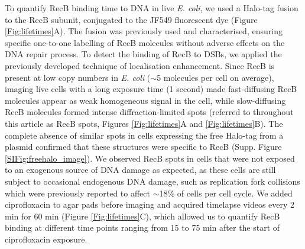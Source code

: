 To quantify RecB binding time to DNA in live \textit{E. coli}, we used a Halo-tag fusion to the RecB subunit, conjugated to the JF549 fluorescent dye (Figure \ref{Fig:lifetimes}A). The fusion was previously used and characterised, ensuring specific one-to-one labelling of RecB molecules without adverse effects on the DNA repair process.\cite{Lepore2019a} To detect the binding of RecB to DSBs, we applied the previously developed technique of localisation enhancement.\cite{Yu2006, Elf2007} Since RecB is present at low copy numbers in \textit{E. coli} ($\sim$5 molecules per cell on average\cite{Lepore2019a}), imaging live cells with a long exposure time (1 second) made fast-diffusing RecB molecules appear as weak homogeneous signal in the cell, while slow-diffusing RecB molecules formed intense diffraction-limited spots (referred to throughout this article as RecB spots, Figures \ref{Fig:lifetimes}A and \ref{Fig:lifetimes}B). The complete absence of similar spots in cells expressing the free Halo-tag from a plasmid confirmed that these structures were specific to RecB (Supp. Figure \ref{SIFig:freehalo_image}). We observed RecB spots in cells that were not exposed to an exogenous source of DNA damage as expected, as these cells are still subject to occasional endogenous DNA damage, such as replication fork collisions which were previously reported to affect $\sim$18\% of cells per cell cycle.\cite{Sinha2018} We added ciprofloxacin to agar pads before imaging and acquired timelapse videos every 2 min for 60 min (Figure \ref{Fig:lifetimes}C), which allowed us to quantify RecB binding at different time points ranging from 15 to 75 min after the start of ciprofloxacin exposure.

